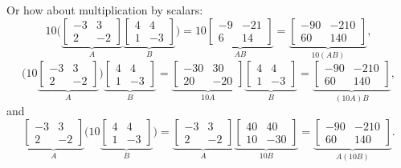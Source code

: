 \begin{example}
Or how about multiplication by scalars:
\begin{equation*}
10
\biggl(
\underbrace{
\begin{bmatrix}
-3 & 3 \\ 2 & -2
\end{bmatrix}
}_A
\underbrace{
\begin{bmatrix}
4 & 4 \\ 1 & -3
\end{bmatrix}
}_B
\biggr)
=
10
\underbrace{
\begin{bmatrix}
-9 & -21 \\ 6 & 14
\end{bmatrix}
}_{A B}
=
\underbrace{
\begin{bmatrix}
-90 & -210 \\ 60 & 140
\end{bmatrix}
}_{10 (AB)} ,
\end{equation*}
\begin{equation*}
\biggl(
10
\underbrace{
\begin{bmatrix}
-3 & 3 \\ 2 & -2
\end{bmatrix}
}_A
\biggr)
\underbrace{
\begin{bmatrix}
4 & 4 \\ 1 & -3
\end{bmatrix}
}_B
=
\underbrace{
\begin{bmatrix}
-30 & 30 \\ 20 & -20
\end{bmatrix}
}_{10 A}
\underbrace{
\begin{bmatrix}
4 & 4 \\ 1 & -3
\end{bmatrix}
}_B
=
\underbrace{
\begin{bmatrix}
-90 & -210 \\ 60 & 140
\end{bmatrix}
}_{(10 A)B} ,
\end{equation*}
and
\begin{equation*}
\underbrace{
\begin{bmatrix}
-3 & 3 \\ 2 & -2
\end{bmatrix}
}_A
\biggl(
10
\underbrace{
\begin{bmatrix}
4 & 4 \\ 1 & -3
\end{bmatrix}
}_B
\biggr)
=
\underbrace{
\begin{bmatrix}
-3 & 3 \\ 2 & -2
\end{bmatrix}
}_{A}
\underbrace{
\begin{bmatrix}
40 & 40 \\ 10 & -30
\end{bmatrix}
}_{10B}
=
\underbrace{
\begin{bmatrix}
-90 & -210 \\ 60 & 140
\end{bmatrix}
}_{A(10B)} .
\end{equation*}
\end{example}

